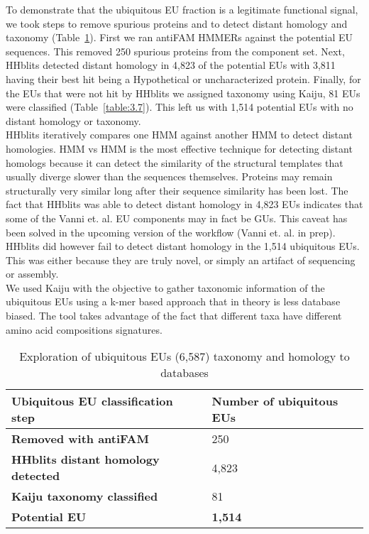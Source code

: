 To demonstrate that the ubiquitous EU fraction is a legitimate functional signal, we took steps to remove spurious proteins and to detect distant homology and taxonomy (Table~\ref{table:3.6}). First we ran antiFAM HMMERs against the potential EU sequences. This removed 250 spurious proteins from the component set. Next, HHblits detected distant homology in 4,823 of the potential EUs with 3,811 having their best hit being a Hypothetical or uncharacterized protein. Finally, for the EUs that were not hit by HHblits we assigned taxonomy using Kaiju, 81 EUs were classified (Table~\ref{table:3.7}). This left us with 1,514 potential EUs with no distant homology or taxonomy.\\

HHblits iteratively compares one HMM against another HMM to detect distant homologies. HMM vs HMM is the most effective technique for detecting distant homologs because it can detect the similarity of the structural templates that usually diverge slower than the sequences themselves. Proteins may remain structurally very similar long after their sequence similarity has been lost. The fact that HHblits was able to detect distant homology in 4,823 EUs indicates that some of the Vanni et. al. EU components may in fact be GUs. This caveat has been solved in the upcoming version of the workflow (Vanni et. al. in prep). HHblits did however fail to detect distant homology in the 1,514 ubiquitous EUs. This was either because they are truly novel, or simply an artifact of sequencing or assembly.\\

We used Kaiju with the objective to gather taxonomic information of the ubiquitous EUs using a k-mer based approach that in theory is less database biased. The tool takes advantage of the fact that different taxa have different amino acid compositions signatures.\\

\begin{table}[H]
\centering
\caption{Exploration of ubiquitous EUs (6,587) taxonomy and homology to databases}
\label{table:3.6}
\begin{tabular}{ll}
\toprule
\textbf{Ubiquitous EU classification step} & \textbf{Number of ubiquitous EUs} \\
\midrule
\textbf{Removed with antiFAM} & 250 \\
\textbf{HHblits distant homology detected} & 4,823 \\
\textbf{Kaiju taxonomy classified} & 81 \\ \midrule
\textbf{Potential EU} & \textbf{1,514} \\
\bottomrule
\end{tabular}
\end{table}

